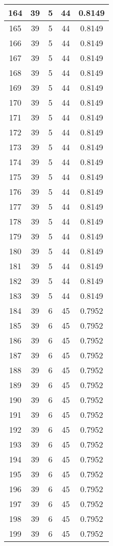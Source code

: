 \documentclass[letterpaper, 12pt]{article}
\begin{document}
\begin{longtable}{|c|c|c|c|c|}
\hline
164 & 39 & 5 & 44 & 0.8149 \\
\hline
165 & 39 & 5 & 44 & 0.8149 \\
\hline
166 & 39 & 5 & 44 & 0.8149 \\
\hline
167 & 39 & 5 & 44 & 0.8149 \\
\hline
168 & 39 & 5 & 44 & 0.8149 \\
\hline
169 & 39 & 5 & 44 & 0.8149 \\
\hline
170 & 39 & 5 & 44 & 0.8149 \\
\hline
171 & 39 & 5 & 44 & 0.8149 \\
\hline
172 & 39 & 5 & 44 & 0.8149 \\
\hline
173 & 39 & 5 & 44 & 0.8149 \\
\hline
174 & 39 & 5 & 44 & 0.8149 \\
\hline
175 & 39 & 5 & 44 & 0.8149 \\
\hline
176 & 39 & 5 & 44 & 0.8149 \\
\hline
177 & 39 & 5 & 44 & 0.8149 \\
\hline
178 & 39 & 5 & 44 & 0.8149 \\
\hline
179 & 39 & 5 & 44 & 0.8149 \\
\hline
180 & 39 & 5 & 44 & 0.8149 \\
\hline
181 & 39 & 5 & 44 & 0.8149 \\
\hline
182 & 39 & 5 & 44 & 0.8149 \\
\hline
183 & 39 & 5 & 44 & 0.8149 \\
\hline
184 & 39 & 6 & 45 & 0.7952 \\
\hline
185 & 39 & 6 & 45 & 0.7952 \\
\hline
186 & 39 & 6 & 45 & 0.7952 \\
\hline
187 & 39 & 6 & 45 & 0.7952 \\
\hline
188 & 39 & 6 & 45 & 0.7952 \\
\hline
189 & 39 & 6 & 45 & 0.7952 \\
\hline
190 & 39 & 6 & 45 & 0.7952 \\
\hline
191 & 39 & 6 & 45 & 0.7952 \\
\hline
192 & 39 & 6 & 45 & 0.7952 \\
\hline
193 & 39 & 6 & 45 & 0.7952 \\
\hline
194 & 39 & 6 & 45 & 0.7952 \\
\hline
195 & 39 & 6 & 45 & 0.7952 \\
\hline
196 & 39 & 6 & 45 & 0.7952 \\
\hline
197 & 39 & 6 & 45 & 0.7952 \\
\hline
198 & 39 & 6 & 45 & 0.7952 \\
\hline
199 & 39 & 6 & 45 & 0.7952 \\
\hline
\end{longtable}
\end{document}
